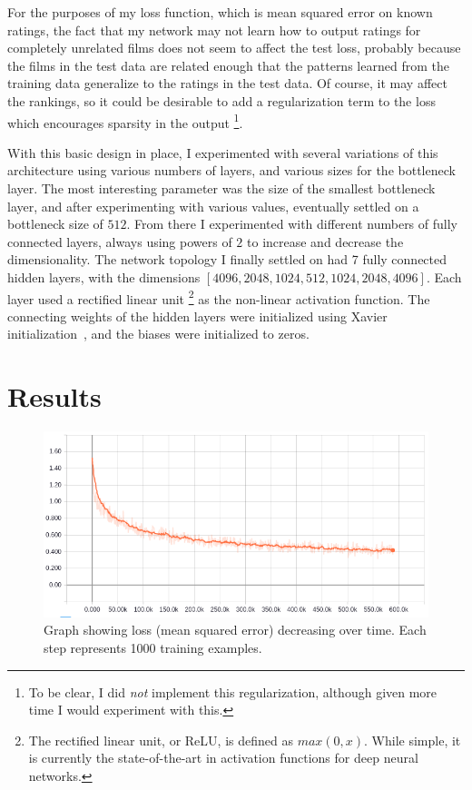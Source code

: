 \documentclass[12pt]{article}
\begin{document}
For the purposes of my loss function, which is mean squared error on known
ratings, the fact that my network may not learn how to output ratings for
completely unrelated films does not seem to affect the test loss, probably
because the films in the test data are related enough that the patterns
learned from the training data generalize to the ratings in the test data.
Of course, it may affect the rankings, so it could be desirable to add a
regularization term to the loss which encourages sparsity in the output%
\footnote{To be clear, I did \textit{not} implement this regularization,
although given more time I would experiment with this.}.

With this basic design in place, I experimented with several variations of
this architecture using various numbers of layers, and various sizes for the
bottleneck layer.
The most interesting parameter was the size of the smallest bottleneck layer,
and after experimenting with various values,  eventually settled on a
bottleneck size of $512$.
From there I experimented with different numbers of fully connected layers,
always using powers of $2$ to increase and decrease the dimensionality.
The network topology I finally settled on had 7 fully connected hidden layers,
with the dimensions
$[4096, 2048, 1024, 512, 1024, 2048, 4096]$.
Each layer used a rectified linear unit%
\footnote{The rectified linear unit, or ReLU, is defined as $max(0, x)$. While
simple, it is currently the state-of-the-art in activation functions for deep
neural networks.}
as the non-linear activation function.
The connecting weights of the hidden layers were initialized using Xavier
initialization~\cite{xavier}, and the biases were initialized to zeros.

\section{Results}
\label{sec:results}

\begin{figure}
\centering
\includegraphics[width=.5\textwidth]{train}
\caption{Graph showing loss (mean squared error) decreasing over time. Each
step represents 1000 training examples.}
\label{fig:train}
\end{figure}
\end{document}
